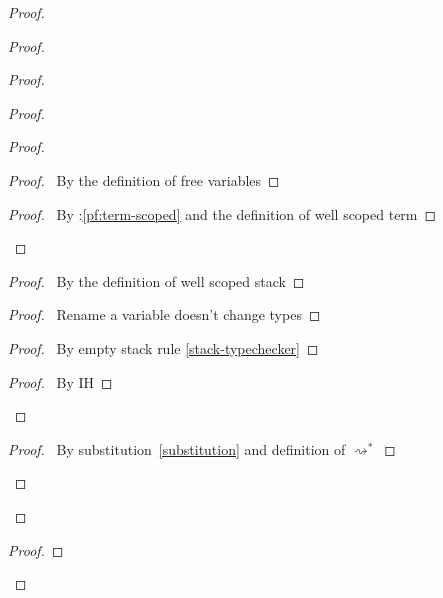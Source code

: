 \documentclass[a4paper]{article}
\begin{document}
\begin{proof}
\begin{proof}
\begin{proof}
\begin{proof}
        \begin{proof}
          \begin{proof}
            \pf\ By the definition of free variables
          \end{proof}
          \qedstep
          \begin{proof}
            \pf\ By \toplevel:\ref{pf:term-scoped} and the definition of well scoped term
          \end{proof}
        \end{proof}
        \begin{proof}
          \pf\ By the definition of well scoped stack
        \end{proof}
        \begin{proof}
          \pf\ Rename a variable doesn't change types
        \end{proof}
        \begin{proof}
          \pf\ By empty stack rule \ref{stack-typechecker}
        \end{proof}
        \qedstep
        \begin{proof}
          \pf\ By IH
        \end{proof}
      \end{proof}
      \begin{proof}
        \pf\ By substitution~\ref{substitution} and definition of $\rightsquigarrow^*$
      \end{proof}
    \end{proof}
  \end{proof}
  \begin{proof}

\end{proof}
\end{proof}
\end{document}
